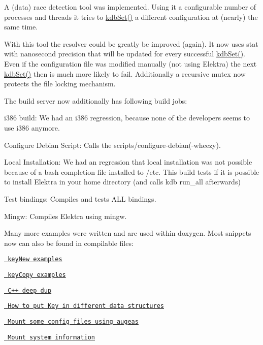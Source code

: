 A (data) race detection tool was implemented. Using it a configurable number of processes and threads it tries to \mbox{\hyperlink{group__kdb_ga11436b058408f83d303ca5e996832bcf}{kdb\+Set()}} a different configuration at (nearly) the same time.

With this tool the resolver could be greatly be improved (again). It now uses stat with nanosecond precision that will be updated for every successful \mbox{\hyperlink{group__kdb_ga11436b058408f83d303ca5e996832bcf}{kdb\+Set()}}. Even if the configuration file was modified manually (not using Elektra) the next \mbox{\hyperlink{group__kdb_ga11436b058408f83d303ca5e996832bcf}{kdb\+Set()}} then is much more likely to fail. Additionally a recursive mutex now protects the file locking mechanism.

The build server now additionally has following build jobs\+:


\begin{DoxyItemize}
\item i386 build\+: We had an i386 regression, because none of the developers seems to use i386 anymore.
\item Configure Debian Script\+: Calls the scripts/configure-\/debian(-\/wheezy).
\item Local Installation\+: We had an regression that local installation was not possible because of a bash completion file installed to /etc. This build tests if it is possible to install Elektra in your home directory (and calls kdb run\+\_\+all afterwards)
\item Test bindings\+: Compiles and tests A\+LL bindings.
\item Mingw\+: Compiles Elektra using mingw.
\end{DoxyItemize}

Many more examples were written and are used within doxygen. Most snippets now can also be found in compilable files\+:


\begin{DoxyItemize}
\item \href{https://github.com/ElektraInitiative/libelektra/tree/master/examples/keyNew.c}{\texttt{ key\+New examples}}
\item \href{https://github.com/ElektraInitiative/libelektra/tree/master/examples/keyCopy.c}{\texttt{ key\+Copy examples}}
\item \href{https://github.com/ElektraInitiative/libelektra/tree/master/src/bindings/cpp/examples/cpp_example_dup.cpp}{\texttt{ C++ deep dup}}
\item \href{https://github.com/ElektraInitiative/libelektra/tree/master/src/bindings/cpp/examples/cpp_example_ordering.cpp}{\texttt{ How to put Key in different data structures}}
\item \href{https://github.com/ElektraInitiative/libelektra/tree/master/scripts/kdb/mount-augeas}{\texttt{ Mount some config files using augeas}}
\item \href{https://github.com/ElektraInitiative/libelektra/tree/master/scripts/kdb/mount-info}{\texttt{ Mount system information}}
\end{DoxyItemize}

